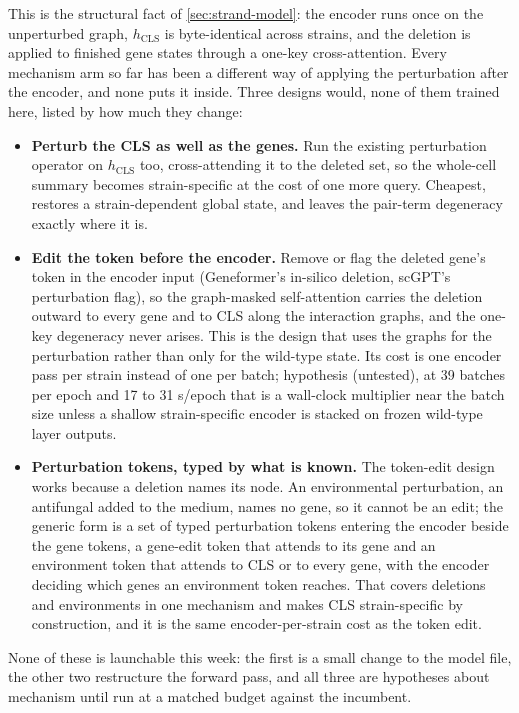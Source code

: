  This
is the structural fact of \cref{sec:strand-model}: the encoder runs once on the unperturbed
graph, $h_{\mathrm{CLS}}$ is byte-identical across strains, and the deletion is applied to
finished gene states through a one-key cross-attention. Every mechanism arm so far has
been a different way of applying the perturbation after the encoder, and none puts it
inside. Three designs would, none of them trained here, listed by how much they change:
\begin{itemize}
\item \textbf{Perturb the CLS as well as the genes.} Run the existing perturbation
  operator on $h_{\mathrm{CLS}}$ too, cross-attending it to the deleted set, so the
  whole-cell summary becomes strain-specific at the cost of one more query. Cheapest,
  restores a strain-dependent global state, and leaves the pair-term degeneracy exactly
  where it is.
\item \textbf{Edit the token before the encoder.} Remove or flag the deleted gene's token
  in the encoder input (Geneformer's in-silico deletion, scGPT's perturbation flag), so the
  graph-masked self-attention carries the deletion outward to every gene and to CLS along
  the interaction graphs, and the one-key degeneracy never arises. This is the design that
  uses the graphs for the perturbation rather than only for the wild-type state. Its cost
  is one encoder pass per strain instead of one per batch; hypothesis (untested), at 39
  batches per epoch and 17 to 31 s/epoch that is a wall-clock multiplier near the batch
  size unless a shallow strain-specific encoder is stacked on frozen wild-type layer
  outputs.
\item \textbf{Perturbation tokens, typed by what is known.} The token-edit design works
  because a deletion names its node. An environmental perturbation, an antifungal added to
  the medium, names no gene, so it cannot be an edit; the generic form is a set of typed
  perturbation tokens entering the encoder beside the gene tokens, a gene-edit token that
  attends to its gene and an environment token that attends to CLS or to every gene, with
  the encoder deciding which genes an environment token reaches. That covers deletions
  and environments in one mechanism and makes CLS strain-specific by construction, and it
  is the same encoder-per-strain cost as the token edit.
\end{itemize}
None of these is launchable this week: the first is a small change to the model file, the
other two restructure the forward pass, and all three are hypotheses about mechanism until
run at a matched budget against the incumbent.

